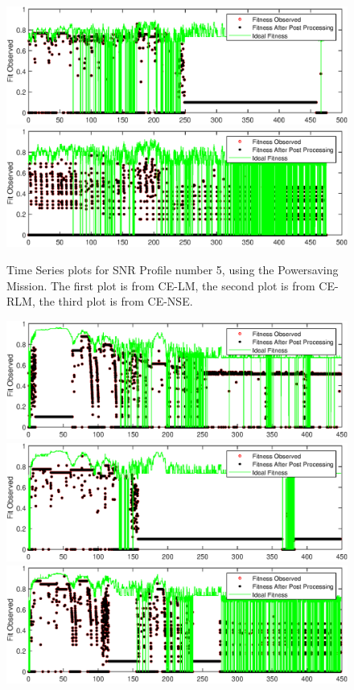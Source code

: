 \begin{appendices}
\begin{figure}[ht!]
\includegraphics{figures/c_sim_timeSeries/Fitness_timeSeries_RLM_5.eps}
\includegraphics{figures/c_sim_timeSeries/Fitness_timeSeries_NSE_5.eps}
\caption{Time Series plots for SNR Profile number 5, using the Powersaving Mission. The first plot is from CE-LM, the second plot is from CE-RLM, the third plot is from CE-NSE.}
\end{figure}
\begin{figure}[ht!]
\includegraphics{figures/c_sim_timeSeries/Fitness_timeSeries_LM_6.eps}
\includegraphics{figures/c_sim_timeSeries/Fitness_timeSeries_RLM_6.eps}
\includegraphics{figures/c_sim_timeSeries/Fitness_timeSeries_NSE_6.eps}

\end{figure}
\end{appendices}
